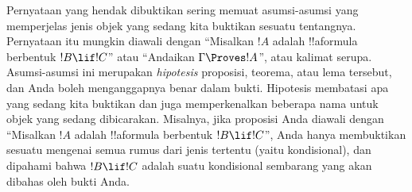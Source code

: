 \documentclass[../../../include/open-logic-section]{subfiles}
\begin{document}
Pernyataan yang hendak dibuktikan sering memuat asumsi-asumsi yang
memperjelas jenis objek yang sedang kita buktikan sesuatu tentangnya.
Pernyataan itu mungkin diawali dengan ``Misalkan $!A$ adalah
!!a{formula} berbentuk $!B \lif !C$'' atau ``Andaikan $\Gamma \Proves
!A$'', atau kalimat serupa. Asumsi-asumsi ini merupakan
\emph{hipotesis} proposisi, teorema, atau lema tersebut, dan Anda boleh
menganggapnya benar dalam bukti. Hipotesis membatasi apa yang sedang
kita buktikan dan juga memperkenalkan beberapa nama untuk objek yang
sedang dibicarakan. Misalnya, jika proposisi Anda diawali dengan
``Misalkan $!A$ adalah !!a{formula} berbentuk $!B \lif !C$'', Anda hanya
membuktikan sesuatu mengenai semua rumus dari jenis tertentu (yaitu
kondisional), dan dipahami bahwa $!B \lif !C$ adalah suatu kondisional
sembarang yang akan dibahas oleh bukti Anda.
\end{document}
